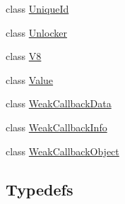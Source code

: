 \begin{DoxyCompactItemize}
\item 
class \hyperlink{classv8_1_1UniqueId}{Unique\+Id}
\item 
class \hyperlink{classv8_1_1Unlocker}{Unlocker}
\item 
class \hyperlink{classv8_1_1V8}{V8}
\item 
class \hyperlink{classv8_1_1Value}{Value}
\item 
class \hyperlink{classv8_1_1WeakCallbackData}{Weak\+Callback\+Data}
\item 
class \hyperlink{classv8_1_1WeakCallbackInfo}{Weak\+Callback\+Info}
\item 
class \hyperlink{classv8_1_1WeakCallbackObject}{Weak\+Callback\+Object}
\end{DoxyCompactItemize}
\subsection*{Typedefs}
